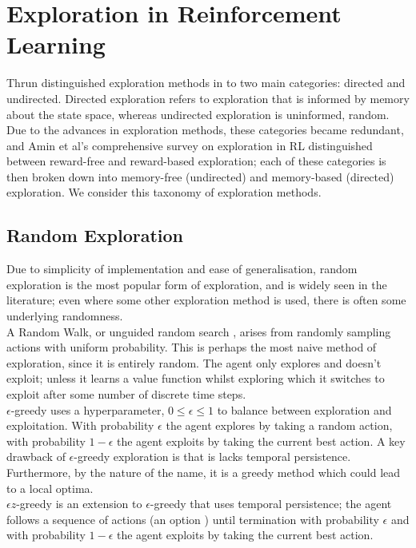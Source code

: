 \section{Exploration in Reinforcement Learning}
Thrun \citep{Thrun-1992-15850} distinguished exploration methods in to two main categories: directed and undirected. Directed exploration refers to exploration that is informed by memory about the state space, whereas undirected exploration is uninformed, random. Due to the advances in exploration methods, these categories became redundant, and Amin et al's \citep{DBLP:journals/corr/abs-2109-00157} comprehensive survey on exploration in RL distinguished between reward-free and reward-based exploration; each of these categories is then broken down into memory-free (undirected) and memory-based (directed) exploration. We consider this taxonomy of exploration methods.
\subsection{Random Exploration}
Due to simplicity of implementation and ease of generalisation, random exploration is the most popular form of exploration, and is widely seen in the literature; even where some other exploration method is used, there is often some underlying randomness.
\\A Random Walk, or unguided random search \citep{anderson86}, arises from randomly sampling actions with uniform probability. This is perhaps the most naive method of exploration, since it is entirely random. The agent only explores and doesn't exploit; unless it learns a value function whilst exploring which it switches to exploit after some number of discrete time steps.
\\$\epsilon$-greedy \citep{Watkins:1989, conf/nips/Sutton95} uses a hyperparameter, $0 \le \epsilon \le 1$ to balance between exploration and exploitation. With probability $\epsilon$ the agent explores by taking a random action, with probability $1-\epsilon$ the agent exploits by taking the current best action. A key drawback of $\epsilon$-greedy exploration is that is lacks temporal persistence. Furthermore, by the nature of the name, it is a greedy method which could lead to a local optima.
\\$\epsilon z$-greedy \citep{dabney2021temporallyextended} is an extension to $\epsilon$-greedy that uses temporal persistence; the agent follows a sequence of actions (an option \citep{SUTTON1999181}) until termination with probability $\epsilon$ and with probability $1-\epsilon$ the agent exploits by taking the current best action.
